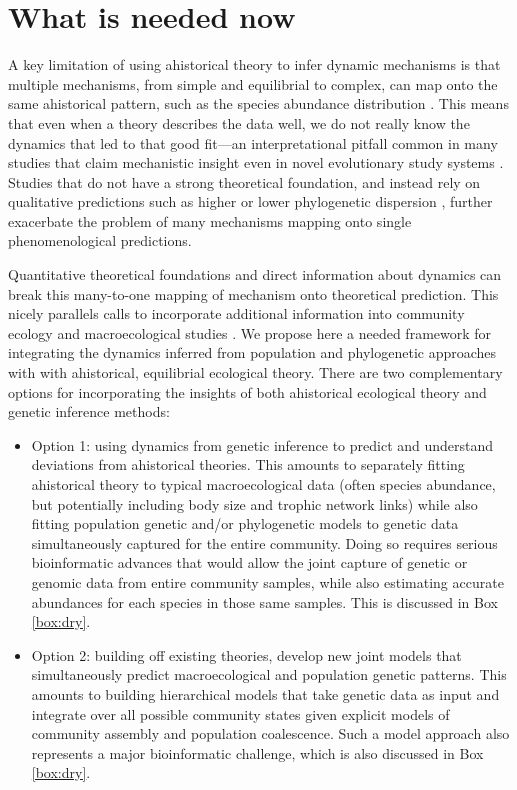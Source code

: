 \documentclass[12pt]{article}
\newcounter{Box}
\begin{document}
\section{What is needed now}

A key limitation of using ahistorical theory to infer dynamic
mechanisms is that multiple mechanisms, from simple and equilibrial to
complex, can map onto the same ahistorical pattern, such as the
species abundance distribution \cite{Kendall1948-pj, Kendall1948-ri,
  Engen1996-jt, Engen1996-na, McGill2003-sf}.  This means that even
when a theory describes the data well, we do not really know the
dynamics that led to that good fit---an interpretational pitfall
common in many studies that claim mechanistic insight even in novel
evolutionary study systems \cite{Hubbell2001-dx, Olszewski2004-ud,
  Wagner2006-te}.  Studies that do not have a strong theoretical
foundation, and instead rely on qualitative predictions such as higher
or lower phylogenetic dispersion \cite{Webb2002-yr}, further
exacerbate the problem of many mechanisms mapping onto single
phenomenological predictions.

Quantitative theoretical foundations and direct information about
dynamics can break this many-to-one mapping of mechanism onto
theoretical prediction. This nicely parallels calls to incorporate
additional information into community ecology and macroecological
studies \cite{McGill2007-zd}. We propose here a needed
framework for integrating the dynamics inferred from population and
phylogenetic approaches with with ahistorical, equilibrial ecological
theory. There are two complementary options for incorporating the
insights of both ahistorical ecological theory and genetic inference
methods:

\begin{itemize}
\item Option 1: using dynamics from genetic inference to predict and
  understand deviations from ahistorical theories. This amounts to
  separately fitting ahistorical theory to typical macroecological
  data (often species abundance, but potentially including body size
  and trophic network links) while also fitting population genetic
  and/or phylogenetic models to genetic data simultaneously captured
  for the entire community. Doing so requires serious bioinformatic
  advances that would allow the joint capture of genetic or genomic
  data from entire community samples, while also estimating accurate
  abundances for each species in those same samples. This is discussed
  in Box \ref{box:dry}.
\item Option 2: building off existing theories, develop new joint
  models that simultaneously predict macroecological and population
  genetic patterns. This amounts to building hierarchical models that
  take genetic data as input and integrate over all possible community
  states given explicit models of community assembly and population
  coalescence. Such a model approach also represents a major
  bioinformatic challenge, which is also discussed in Box
  \ref{box:dry}.
\end{itemize}
\end{document}
